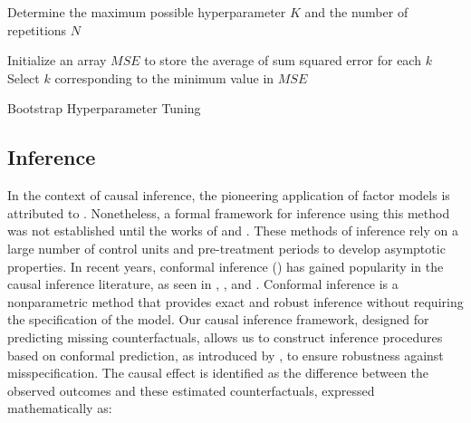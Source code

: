 \documentclass[12pt]{article}
\begin{document}
\begin{algorithm}[!ht]
    \SetAlgoLined
    Determine the maximum possible hyperparameter $K$ and the number of repetitions $N$\;

    Initialize an array $MSE$ to store the average of sum squared error for each $k$\;
    Select $k$ corresponding to the minimum value in $MSE$\;
    \caption{Bootstrap Hyperparameter Tuning}
    \label{algorithm: 1}
\end{algorithm}

\subsection{Inference}

In the context of causal inference, the pioneering application of factor models is attributed to \cite{hsiao2012panel}. Nonetheless, a formal framework for inference using this method was not established until the works of \cite{chan2016policy} and \cite{li2018inference}. These methods of inference rely on a large number of control units and pre-treatment periods to develop asymptotic properties. In recent years, conformal inference (\cite{chernozhukov2021exact}) has gained popularity in the causal inference literature, as seen in \cite{ben2021augmented}, \cite{roth2023s}, and \cite{imbens2024causal}. Conformal inference is a nonparametric method that provides exact and robust inference without requiring the specification of the model. Our causal inference framework, designed for predicting missing counterfactuals, allows us to construct inference procedures based on conformal prediction, as introduced by \cite{shafer2008tutorial}, to ensure robustness against misspecification. The causal effect is identified as the difference between the observed outcomes and these estimated counterfactuals, expressed mathematically as:
\end{document}
